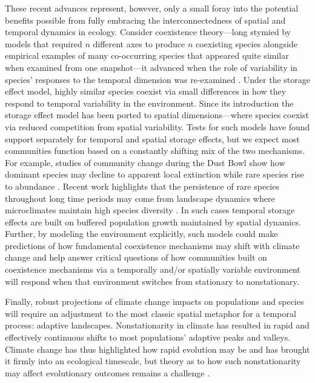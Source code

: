 \documentclass[11pt,a4paper,oneside]{article}
\begin{document}
These recent advances represent, however, only a small foray into the potential benefits possible from fully embracing the interconnectedness of spatial and temporal dynamics in ecology. Consider coexistence theory---long stymied by models that required \(n\) different axes to produce \(n\) coexisting species alongside empirical examples of many co-occurring species that appeared quite similar when examined from one snapshot---it advanced when the role of variability in species' responses to the temporal dimension was re-examined \citep{Chesson:1997dz}. Under the storage effect model, highly similar species coexist via small differences in how they respond to temporal variability in the environment. Since its introduction the storage effect model has been ported to spatial dimensions---where species coexist via reduced competition from spatial variability. Tests for such models have found support separately for temporal \citep{Angert:2009} and spatial \citep{Sears:2007md} storage effects, but we expect most communities function based on a constantly shifting mix of the two mechanisms. For example, studies of community change during the Dust Bowl show how dominant species may decline to apparent local extinction while rare species rise to abundance \citep{Weaver1936}. Recent work highlights that the persistence of rare species throughout long time periods may come from landscape dynamics where microclimates maintain high species diversity \citep{Craine2012}. In such cases temporal storage effects are built on buffered population growth maintained by spatial dynamics. Further, by modeling the environment explicitly, such models could make predictions of how fundamental coexistence mechanisms may shift with climate change and help answer critical questions of how communities built on coexistence mechanisms via a temporally and/or spatially variable environment will respond when that environment switches from stationary to nonstationary. 

Finally, robust projections of climate change impacts on populations and species will require an adjustment to the most classic spatial metaphor for a temporal process: adaptive landscapes. Nonstationarity in climate has resulted in rapid and effectively continuous shifts to most populations' adaptive peaks and valleys. Climate change has thus highlighted how rapid evolution may be and has brought it firmly into an ecological timescale, but theory as to how such nonstationarity may affect evolutionary outcomes remains a challenge \citep{schoener2011,Bailey2014}. \\ %
\end{document}
